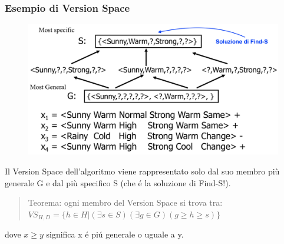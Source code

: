 \documentclass{article}
\begin{document}
\subsubsection{Esempio di Version Space}
\begin{figure}[H]
    \centering
    \includegraphics[scale=0.4]{Images/versionspacegs.png}
\end{figure}
Il Version Space dell'algoritmo viene rappresentato solo dal suo membro più generale G e dal più specifico S (che é la soluzione di Find-S!).
\begin{quote}
    Teorema: ogni membro del Version Space si trova tra: \newline 
    $VS_{H,D} = \{h \in H| (\exists s \in S) (\exists g \in G) (g \geq h \geq s)\}$
\end{quote}
dove $x \geq y$ significa x é piú generale o uguale a y.
\clearpage
\end{document}
